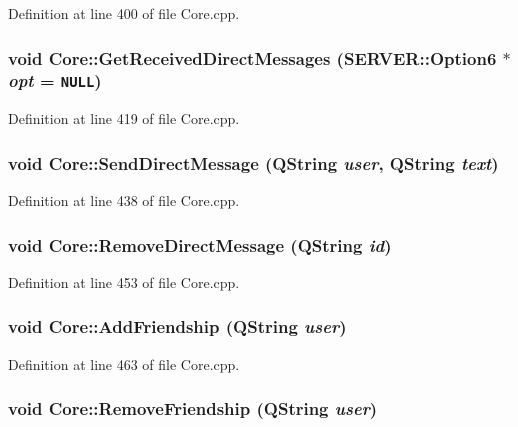 Definition at line 400 of file Core.cpp.\hypertarget{classCore_5496ee42ce9d32aa0f98a2d56e3bbddf}{
\subsubsection{\setlength{\rightskip}{0pt plus 5cm}void Core::GetReceivedDirectMessages ({\bf SERVER::Option6} $\ast$ {\em opt} = {\tt NULL})}}
\label{classCore_5496ee42ce9d32aa0f98a2d56e3bbddf}




Definition at line 419 of file Core.cpp.\hypertarget{classCore_f6afb71b9114a90e9b9856f64a6fe9cf}{
\subsubsection{\setlength{\rightskip}{0pt plus 5cm}void Core::SendDirectMessage (QString {\em user}, \/  QString {\em text})}}
\label{classCore_f6afb71b9114a90e9b9856f64a6fe9cf}




Definition at line 438 of file Core.cpp.\hypertarget{classCore_d98d496c44ebff775698737f8edbde44}{
\subsubsection{\setlength{\rightskip}{0pt plus 5cm}void Core::RemoveDirectMessage (QString {\em id})}}
\label{classCore_d98d496c44ebff775698737f8edbde44}




Definition at line 453 of file Core.cpp.\hypertarget{classCore_3df3b62fa5366492a3eb4bba99f1849a}{
\subsubsection{\setlength{\rightskip}{0pt plus 5cm}void Core::AddFriendship (QString {\em user})}}
\label{classCore_3df3b62fa5366492a3eb4bba99f1849a}




Definition at line 463 of file Core.cpp.\hypertarget{classCore_95ce85046d01f3d5d6928f06e8aab99c}{
\subsubsection{\setlength{\rightskip}{0pt plus 5cm}void Core::RemoveFriendship (QString {\em user})}}
\label{classCore_95ce85046d01f3d5d6928f06e8aab99c}




